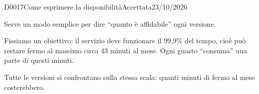 \begin{decisione}{D0017}{Come esprimere la disponibilità}{Accettata}{23/10/2026}

\contesto
Serve un modo semplice per dire ``quanto è affidabile'' ogni versione.

\scelta
Fissiamo un obiettivo: il servizio deve funzionare il 99,9\% del tempo, cioè può restare fermo al massimo circa 43 minuti al mese. Ogni guasto ``consuma'' una parte di questi minuti.

\conseguenze
Tutte le versioni si confrontano sulla stessa scala: quanti minuti di fermo al mese costerebbero.

\end{decisione}

